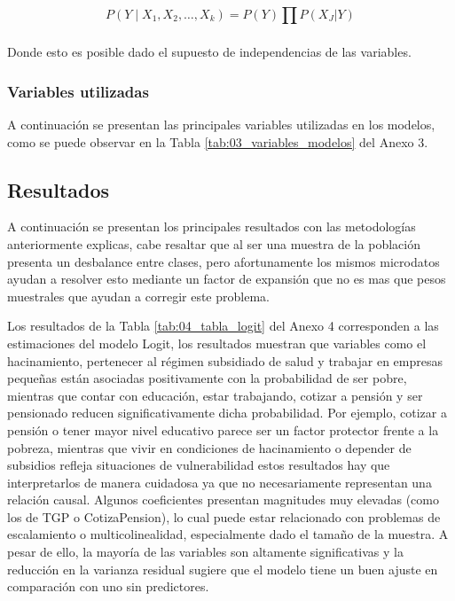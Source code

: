 \documentclass[12pt,a4paper,onecolumn]{article}
\begin{document}
$$P\left( Y \middle| X_{1},X_{2},\ldots,X_{k} \right) = P(Y)\prod_{}^{}{P(X_{J}|Y)}$$

Donde esto es posible dado el supuesto de independencias de las variables.

\subsubsection{Variables utilizadas}
A continuación se presentan las principales variables utilizadas en los modelos, como se puede observar en la Tabla \ref{tab:03_variables_modelos} del Anexo 3.

\subsection{Resultados}

A continuación se presentan los principales resultados con las metodologías anteriormente explicas, cabe resaltar que al ser una muestra de la población presenta un desbalance entre clases, pero afortunamente los mismos microdatos ayudan a resolver esto mediante un factor de expansión que no es mas que pesos muestrales que ayudan a corregir este problema.

Los resultados de la Tabla \ref{tab:04_tabla_logit} del Anexo 4 corresponden a las estimaciones del modelo Logit, los resultados muestran que variables como el hacinamiento, pertenecer al régimen subsidiado de salud y trabajar en empresas pequeñas están asociadas positivamente con la probabilidad de ser pobre, mientras que contar con educación, estar trabajando, cotizar a pensión y ser pensionado reducen significativamente dicha probabilidad. Por ejemplo, cotizar a pensión o tener mayor nivel educativo parece ser un factor protector frente a la pobreza, mientras que vivir en condiciones de hacinamiento o depender de subsidios refleja situaciones de vulnerabilidad estos resultados hay que interpretarlos de manera cuidadosa ya que no necesariamente representan una relación causal. Algunos coeficientes presentan magnitudes muy elevadas (como los de TGP o CotizaPension), lo cual puede estar relacionado con problemas de escalamiento o multicolinealidad, especialmente dado el tamaño de la muestra. A pesar de ello, la mayoría de las variables son altamente significativas y la reducción en la varianza residual sugiere que el modelo tiene un buen ajuste en comparación con uno sin predictores.
\end{document}
